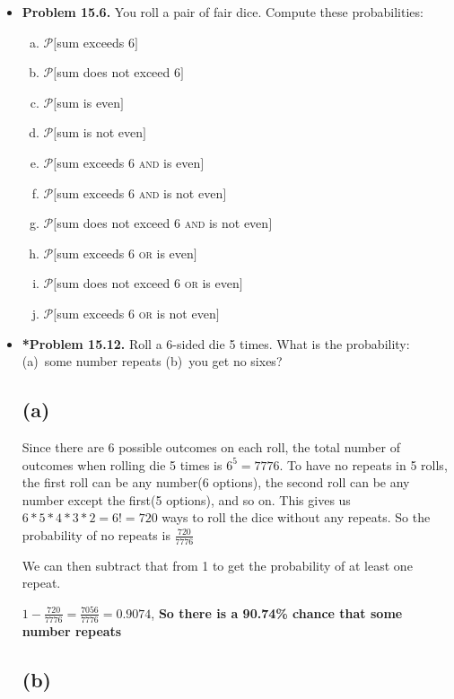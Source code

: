 \documentclass[11pt]{article}
\begin{document}
\begin{itemize}
\item \textbf{Problem 15.6.}
You roll a pair of fair dice.
Compute these probabilities:
\begin{multicols}{2}
\begin{enumerate}[(a)]
\item $\mathcal{P}[$sum exceeds 6$]$
\item $\mathcal{P}[$sum does not exceed 6$]$
\item $\mathcal{P}[$sum is even$]$
\item $\mathcal{P}[$sum is not even$]$
\item $\mathcal{P}[$sum exceeds 6 \textsc{and} is even$]$
\item $\mathcal{P}[$sum exceeds 6 \textsc{and} is not even$]$
\item $\mathcal{P}[$sum does not exceed 6 \textsc{and} is not even$]$
\item $\mathcal{P}[$sum exceeds 6 \textsc{or} is even$]$
\item $\mathcal{P}[$sum does not exceed 6 \textsc{or} is even$]$
\item $\mathcal{P}[$sum exceeds 6 \textsc{or} is not even$]$
\end{enumerate}
\end{multicols}

\newpage

\item \textbf{*Problem 15.12.}
Roll a 6-sided die 5 times.
What is the probability:
(a)~some number repeats
(b)~you get no sixes?

\subsection*{(a)}

Since there are 6 possible outcomes on each roll, the total number of outcomes when rolling die 5 times is $6^5 = 7776$. To have no repeats in 5 rolls, the first roll can be any number(6 options), the second roll can be any number except the first(5 options), and so on. This gives us $6 * 5*4*3*2 = 6! = 720$ ways to roll the dice without any repeats. So the probability of no repeats is $\frac{720}{7776}$

We can then subtract that from 1 to get the probability of at least one repeat. 

$1 - \frac{720}{7776} = \frac{7056}{7776} = 0.9074$, \textbf{So there is a 90.74\% chance that some number repeats}

\subsection*{(b)}


\end{itemize}
\end{document}
